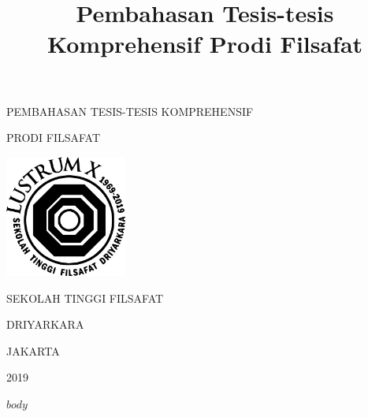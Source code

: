 \documentclass[10pt,a4paper]{article}
\title{Pembahasan Tesis-tesis Komprehensif Prodi Filsafat}
\begin{document}
\begin{titlepage}
	\begin{center}
    \vfill
		{\lsstyle\Huge PEMBAHASAN TESIS-TESIS KOMPREHENSIF\par}
    \vfill
    {\lsstyle\LARGE PRODI FILSAFAT\par}
    \vfill
    \includegraphics[width=4cm,height=4cm]{logo-stfd-lustrum.png}
    \vfill
    {\lsstyle\Large SEKOLAH TINGGI FILSAFAT\par}
    {\lsstyle\Large DRIYARKARA\par}
    \vfill
    {\lsstyle\Large JAKARTA\par}
		{\Large 2019\par}
\end{center}
\end{titlepage}


\setcounter{secnumdepth}{0}
\setcounter{tocdepth}{2}
\begin{multicols}{2}
\tableofcontents
$body$
\end{multicols}
\end{document}
